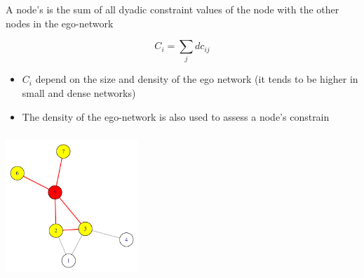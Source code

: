 \documentclass[8pt]{beamer}
\begin{document}


\begin{frame}
\frametitle{\insertsection}
\framesubtitle{\insertsubsection}

A node's {\color{blue}{constraint}} is the sum of all dyadic constraint values of the node with the other nodes in the ego-network \cite{Burt1992}

\begin{equation*}
C_{i} = \sum_{j}{dc_{ij}} 
\end{equation*}

\begin{itemize}
	\item $C_{i}$ depend on the size and density of the ego network (it tends to be higher in small and dense networks)
	\item The density of the ego-network is also used to assess a node's constrain
\end{itemize}
		
\end{frame}


\begin{frame}
\frametitle{\insertsection}
\framesubtitle{\insertsubsection}

\centering
\includegraphics[width=5cm]{egonet}

\medskip


\end{frame}

\end{document}
